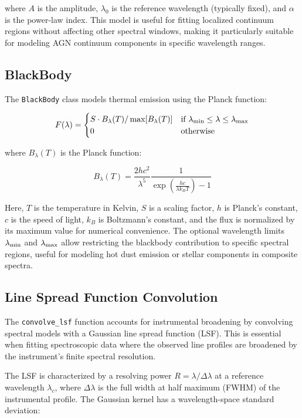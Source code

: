 \documentclass[11pt]{article}
\begin{document}
where $A$ is the amplitude, $\lambda_0$ is the reference wavelength (typically fixed), and $\alpha$ is the power-law index. This model is useful for fitting localized continuum regions without affecting other spectral windows, making it particularly suitable for modeling AGN continuum components in specific wavelength ranges.

\subsection{BlackBody}

The \texttt{BlackBody} class models thermal emission using the Planck function:

\begin{equation}
F(\lambda) = \begin{cases}
S \cdot B_\lambda(T) / \max[B_\lambda(T)] & \text{if } \lambda_{\rm min} \leq \lambda \leq \lambda_{\rm max} \\
0 & \text{otherwise}
\end{cases}
\end{equation}

where $B_\lambda(T)$ is the Planck function:

\begin{equation}
B_\lambda(T) = \frac{2hc^2}{\lambda^5} \frac{1}{\exp\left(\frac{hc}{\lambda k_B T}\right) - 1}
\end{equation}

Here, $T$ is the temperature in Kelvin, $S$ is a scaling factor, $h$ is Planck's constant, $c$ is the speed of light, $k_B$ is Boltzmann's constant, and the flux is normalized by its maximum value for numerical convenience. The optional wavelength limits $\lambda_{\rm min}$ and $\lambda_{\rm max}$ allow restricting the blackbody contribution to specific spectral regions, useful for modeling hot dust emission or stellar components in composite spectra.

\subsection{Line Spread Function Convolution}

The \texttt{convolve\_lsf} function accounts for instrumental broadening by convolving spectral models with a Gaussian line spread function (LSF). This is essential when fitting spectroscopic data where the observed line profiles are broadened by the instrument's finite spectral resolution.

The LSF is characterized by a resolving power $R = \lambda/\Delta\lambda$ at a reference wavelength $\lambda_c$, where $\Delta\lambda$ is the full width at half maximum (FWHM) of the instrumental profile. The Gaussian kernel has a wavelength-space standard deviation:
\end{document}
